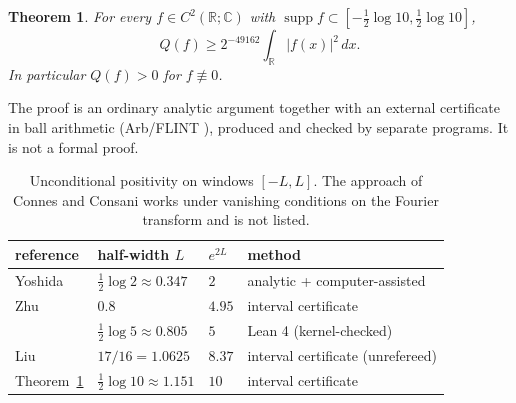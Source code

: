 \documentclass[11pt]{amsart}
\newtheorem{theorem}{Theorem}
\theoremstyle{remark}
\numberwithin{equation}{section}
\newcommand{\R}{\mathbb{R}}
\newcommand{\C}{\mathbb{C}}
\begin{document}
\begin{theorem}\label{thm:L}
For every $f\in C^2(\R;\C)$ with $\operatorname{supp}f\subset[-\frac12\log10,\frac12\log10]$,
\[
Q(f)\ge2^{-49162}\int_\R|f(x)|^2\,dx .
\]
In particular $Q(f)>0$ for $f\not\equiv0$.
\end{theorem}

The proof is an ordinary analytic argument together with an external certificate in ball arithmetic (Arb/FLINT \cite{Arb}), produced and checked by separate programs. It is not a formal proof.

\begin{table}[h]
\centering\small
\begin{tabular}{llll}
\toprule
reference & half-width $L$ & $e^{2L}$ & method\\
\midrule
Yoshida \cite{Yoshida1992} & $\frac12\log2\approx0.347$ & $2$ & analytic + computer-assisted\\
Zhu \cite{Zhu2026} & $0.8$ & $4.95$ & interval certificate\\
\cite{MoriLog5} & $\frac12\log5\approx0.805$ & $5$ & Lean 4 (kernel-checked)\\
Liu \cite{Liu2026} & $17/16=1.0625$ & $8.37$ & interval certificate (unrefereed)\\
Theorem~\ref{thm:L} & $\frac12\log10\approx1.151$ & $10$ & interval certificate\\
\bottomrule
\end{tabular}
\caption{Unconditional positivity on windows $[-L,L]$. The approach of Connes and Consani \cite{CC20} works under vanishing conditions on the Fourier transform and is not listed.}
\end{table}
\end{document}
